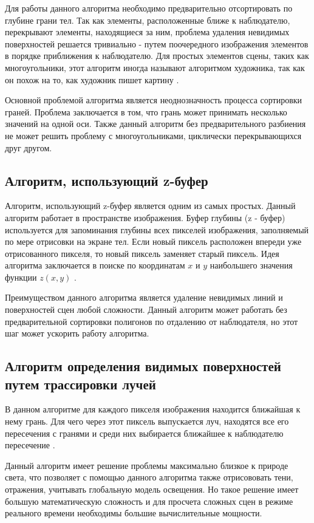 Для работы данного алгоритма необходимо предварительно отсортировать по глубине грани тел. Так как элементы, расположенные ближе к наблюдателю, перекрывают элементы, находящиеся за ним, проблема удаления невидимых поверхностей решается тривиально - путем поочередного изображения элементов в порядке приближения к наблюдателю. Для простых элементов сцены, таких как многоугольники, этот алгоритм иногда называют алгоритмом художника, так как он похож на то, как художник пишет картину  \cite{Rogers89}.
\par
Основной проблемой алгоритма является неоднозначность процесса сортировки граней. Проблема заключается в том, что  грань может принимать несколько значений на одной оси. Также данный алгоритм без предварительного разбиения не может решить проблему с многоугольниками, циклически перекрывающихся друг другом.

\subsection{Алгоритм, использующий z-буфер}

Алгоритм, использующий z-буфер является одним из самых простых. Данный алгоритм работает в пространстве изображения. Буфер глубины (z - буфер) используется для запоминания глубины всех пикселей изображения, заполняемый по мере отрисовки на экране тел. Если новый пиксель расположен впереди уже отрисованного пикселя, то новый пиксель заменяет старый пиксель. Идея алгоритма заключается в поиске по координатам $x$ и $y$ наибольшего значения функции $z(x,y)$ \cite{Rogers89}.
\par
Преимуществом данного алгоритма является удаление невидимых линий и поверхностей сцен любой сложности. Данный алгоритм может работать без предварительной сортировки полигонов по отдалению от наблюдателя, но этот шаг может ускорить работу алгоритма. 

\subsection{Алгоритм определения видимых поверхностей путем трассировки лучей}

В данном алгоритме для каждого пикселя изображения находится ближайшая к нему грань. Для чего через этот пиксель выпускается луч, находятся все его пересечения с гранями и среди них выбирается ближайшее к наблюдателю пересечение  \cite{Rogers89}. 
\par
Данный алгоритм имеет решение проблемы максимально близкое к природе света, что позволяет с помощью данного алгоритма  также отрисововать тени, отражения, учитывать глобальную модель освещения. Но такое решение имеет большую математическую сложность и для просчета сложных сцен в режиме реального времени необходимы большие вычислительные мощности.  

